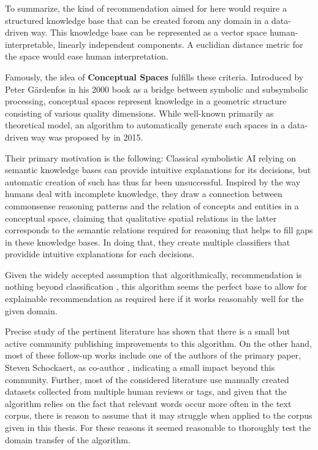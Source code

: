 
To summarize, the kind of recommendation aimed for here would require a structured knowledge base that can be created forom any domain in a data-driven way. This knowledge base can be represented as a vector space human-interpretable, linearly independent components. A euclidian distance metric for the space would ease human interpretation. 

Famously, the idea of \textbf{Conceptual Spaces} fulfills these criteria. Introduced by Peter Gärdenfos in his 2000 book  \cite{Gardenfors2000a} as a bridge between symbolic and subsymbolic processing, conceptual spaces represent knowledge in a geometric structure consisting of various quality dimensions. While well-known primarily as theoretical model, an algorithm to automatically generate such spaces in a data-driven way was proposed by  in 2015.

Their primary motivation is the following: Classical symbolistic AI relying on semantic knowledge bases can provide intuitive explanations for its decisions, but automatic creation of such has thus far been unsuccessful. Inspired by the way humans deal with incomplete knowledge, they draw a connection between commonsense reasoning patterns and the relation of concepts and entities in a conceptual space, claiming that qualitative spatial relations in the latter corresponds to the semantic relations required for reasoning that helps to fill gaps in these knowledge bases. In doing that, they create multiple classifiers that providide intuitive explanations for each decisions. 

Given the widely accepted assumption that algorithmically, recommendation is nothing beyond classification \cite{Linden2003,Ai2018,Sarwar2000}, this algorithm seems the perfect base to allow for explainable recommendation as required here if it works reasonably well for the given domain.

Precise study of the pertinent literature has shown that there is a small but active community publishing improvements to this algorithm. On the other hand, most of these follow-up works include one of the authors of the primary paper, Steven Schockaert, as co-author \cite{Ager2018,Alshaikh2020}, indicating a small impact beyond this community. Further, most of the considered literature use manually created datasets collected from multiple human reviews or tags, and given that the algorithm relies on the fact that relevant words occur more often in the text corpus, there is reason to assume that it may struggle when applied to the corpus given in this thesis. For these reasons it seemed reasonable to thoroughly test the domain transfer of the algorithm.

